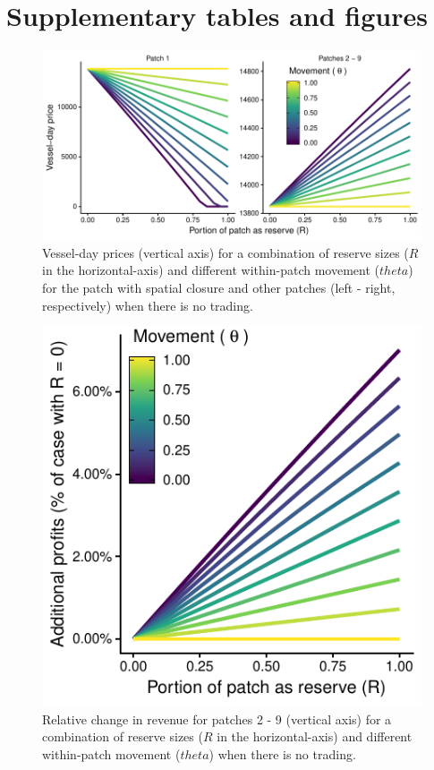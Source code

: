 \documentclass[12pt]{article}
\begin{document}
\clearpage

\section{Supplementary tables and figures}

\begin{figure}
\centering
\includegraphics{img/vessel_day_price_no_trading_plot.pdf}
\caption{\label{fig:vessel_day_price_no_trading_plot}Vessel-day prices (vertical axis) for a combination of reserve sizes ($R$ in the horizontal-axis) and different within-patch movement ($theta$) for the patch with spatial closure and other patches (left - right, respectively) when there is no trading.}
\end{figure}

\begin{figure}
\centering
\includegraphics{img/profits_PNA_notKIR_no_trading_plot.pdf}
\caption{\label{fig:profits_PNA_notKIR_no_trading_plot}Relative change in revenue for patches 2 - 9 (vertical axis) for a combination of reserve sizes ($R$ in the horizontal-axis) and different within-patch movement ($theta$) when there is no trading.}
\end{figure}
\end{document}
